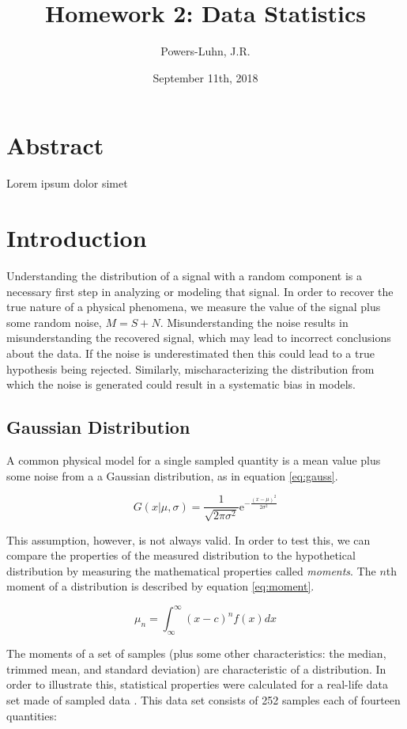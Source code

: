 \documentclass{IEEEtran}
\author{Powers-Luhn, J.R.}
\title{Homework 2: Data Statistics}
\date{September 11th, 2018}
\begin{document}
\maketitle

\section{Abstract}
Lorem ipsum dolor simet \cite{1985Gbcp}

\section{Introduction}
Understanding the distribution of a signal with a random component is a necessary first step in analyzing or modeling that signal. In order to recover the true nature of a physical phenomena, we measure the value of the signal plus some random noise, $M = S + N$. Misunderstanding the noise results in misunderstanding the recovered signal, which may lead to incorrect conclusions about the data. If the noise is underestimated then this could lead to a true hypothesis being rejected. Similarly, mischaracterizing the distribution from which the noise is generated could result in a systematic bias in models.

\subsection{Gaussian Distribution}
A common physical model for a single sampled quantity is a mean value plus some noise from a a Gaussian distribution, as in equation \ref{eq:gauss}.

\begin{equation}
	G(x | \mu, \sigma) = \frac{1}{\sqrt{2 \pi \sigma^2}} \mathrm{e}^{-\frac{(x-\mu)^2}{2 \sigma^2}}
	\label{eq:gauss}
\end{equation}

This assumption, however, is not always valid. In order to test this, we can compare the properties of the measured distribution to the hypothetical distribution by measuring the mathematical properties called \textit{moments}. The $n$th moment of a distribution is described by equation \ref{eq:moment}.

\begin{equation}
	\mu_n = \int_{\infty}^{\infty} (x - c)^n f(x) dx
	\label{eg:moment}
\end{equation}

The moments of a set of samples (plus some other characteristics: the median, trimmed mean, and standard deviation) are characteristic of a distribution. In order to illustrate this, statistical properties were calculated for a real-life data set made of sampled data \cite{1985Gbcp}. This data set consists of 252 samples each of fourteen quantities:
\end{document}
